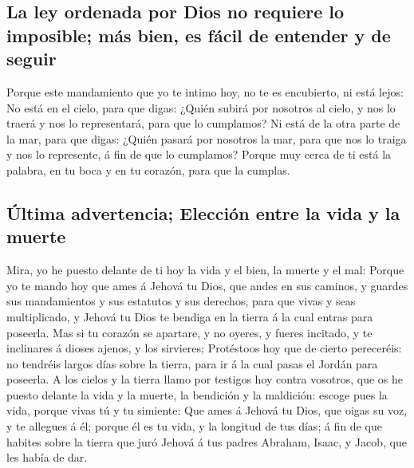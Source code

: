 \hypertarget{la-ley-ordenada-por-dios-no-requiere-lo-imposible-muxe1s-bien-es-fuxe1cil-de-entender-y-de-seguir}{%
\subsection{La ley ordenada por Dios no requiere lo imposible; más bien,
es fácil de entender y de
seguir}\label{la-ley-ordenada-por-dios-no-requiere-lo-imposible-muxe1s-bien-es-fuxe1cil-de-entender-y-de-seguir}}

 Porque este mandamiento que yo te intimo hoy, no te es
encubierto, ni está lejos:  No está en el cielo, para que
digas: ¿Quién subirá por nosotros al cielo, y nos lo traerá y nos lo
representará, para que lo cumplamos?  Ni está de la otra
parte de la mar, para que digas: ¿Quién pasará por nosotros la mar, para
que nos lo traiga y nos lo represente, á fin de que lo cumplamos?
 Porque muy cerca de ti está la palabra, en tu boca y en
tu corazón, para que la cumplas.

\hypertarget{uxfaltima-advertencia-elecciuxf3n-entre-la-vida-y-la-muerte}{%
\subsection{Última advertencia; Elección entre la vida y la
muerte}\label{uxfaltima-advertencia-elecciuxf3n-entre-la-vida-y-la-muerte}}

 Mira, yo he puesto delante de ti hoy la vida y el bien,
la muerte y el mal:  Porque yo te mando hoy que ames á
Jehová tu Dios, que andes en sus caminos, y guardes sus mandamientos y
sus estatutos y sus derechos, para que vivas y seas multiplicado, y
Jehová tu Dios te bendiga en la tierra á la cual entras para poseerla.
 Mas si tu corazón se apartare, y no oyeres, y fueres
incitado, y te inclinares á dioses ajenos, y los sirvieres;
 Protéstoos hoy que de cierto pereceréis: no tendréis
largos días sobre la tierra, para ir á la cual pasas el Jordán para
poseerla.  A los cielos y la tierra llamo por testigos
hoy contra vosotros, que os he puesto delante la vida y la muerte, la
bendición y la maldición: escoge pues la vida, porque vivas tú y tu
simiente:  Que ames á Jehová tu Dios, que oigas su voz, y
te allegues á él; porque él es tu vida, y la longitud de tus días; á fin
de que habites sobre la tierra que juró Jehová á tus padres Abraham,
Isaac, y Jacob, que les había de dar.

